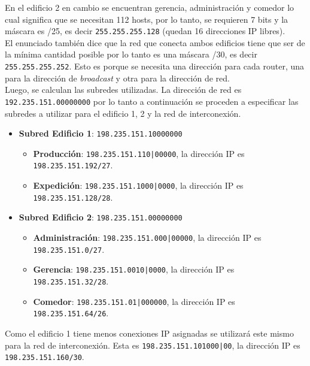 En el edificio 2 en cambio se encuentran gerencia, administración y comedor lo cual significa que se necesitan 112 hosts, por lo tanto, se requieren 7 bits y la máscara es /25, es decir \texttt{255.255.255.128} (quedan 16 direcciones IP libres).\\

El enunciado también dice que la red que conecta ambos edificios tiene que ser de la mínima cantidad posible por lo tanto es una máscara /30, es decir \texttt{255.255.255.252}. Esto es porque se necesita una dirección para cada router, una para la dirección de \textit{broadcast} y otra para la dirección de red. \\

Luego, se calculan las subredes utilizadas. La dirección de red es \texttt{192.235.151.00000000} por lo tanto a continuación se proceden a especificar las subredes a utilizar para el edificio 1, 2 y la red de interconexión.\\

\begin{itemize}
    \item \textbf{Subred Edificio 1}: \texttt{198.235.151.10000000} 
    \begin{itemize}
        \item \textbf{Producción}: \texttt{198.235.151.110|00000}, la dirección IP es \texttt{198.235.151.192/27}.
        \item \textbf{Expedición}: \texttt{198.235.151.1000|0000}, la dirección IP es \texttt{198.235.151.128/28}.
    \end{itemize}
    \item \textbf{Subred Edificio 2}: \texttt{198.235.151.00000000} 
    \begin{itemize}
        \item \textbf{Administración}: \texttt{198.235.151.000|00000}, la dirección IP es \texttt{198.235.151.0/27}.
        \item \textbf{Gerencia}: \texttt{198.235.151.0010|0000}, la dirección IP es \texttt{198.235.151.32/28}.
        \item \textbf{Comedor}: \texttt{198.235.151.01|000000}, la dirección IP es \texttt{198.235.151.64/26}.
    \end{itemize}
\end{itemize}

Como el edificio 1 tiene menos conexiones IP asignadas se utilizará este mismo para la red de interconexión. Esta es \texttt{198.235.151.101000|00}, la dirección IP es \texttt{198.235.151.160/30}.\\

